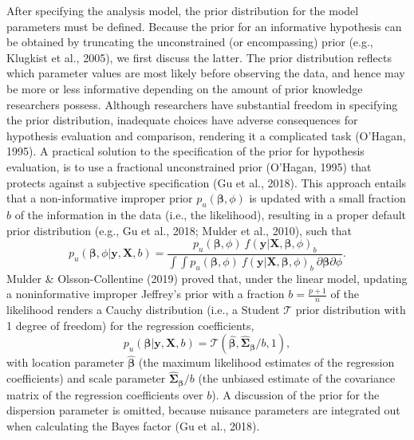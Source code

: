 \documentclass[
]{interact}
\begin{document}
After specifying the analysis model, the prior distribution for the
model parameters must be defined. Because the prior for an informative
hypothesis can be obtained by truncating the unconstrained (or
                                                            encompassing) prior (e.g., Klugkist et al., 2005), we first discuss the
latter. The prior distribution reflects which parameter values are most
likely before observing the data, and hence may be more or less
informative depending on the amount of prior knowledge researchers
possess. Although researchers have substantial freedom in specifying the
prior distribution, inadequate choices have adverse consequences for
hypothesis evaluation and comparison, rendering it a complicated task
(O'Hagan, 1995). A practical solution to the specification of the prior
for hypothesis evaluation, is to use a fractional unconstrained prior
(O'Hagan, 1995) that protects against a subjective specification (Gu et
                                                                  al., 2018). This approach entails that a non-informative improper prior
\(p_u(\boldsymbol{\beta}, \phi)\) is updated with a small fraction \(b\)
of the information in the data (i.e., the likelihood), resulting in a
proper default prior distribution (e.g., Gu et al., 2018; Mulder et al.,
                                   2010), such that \[
                                     p_u(\boldsymbol{\beta}, \phi|\boldsymbol{y}, \boldsymbol{X}, b) = 
                                       \frac{
                                         p_u(\boldsymbol{\beta}, \phi) ~ f(\boldsymbol{y}|\boldsymbol{X}, \boldsymbol{\beta}, \phi)_b
                                       }{
                                         \int \int p_u(\boldsymbol{\beta}, \phi) ~ 
                                           f(\boldsymbol{y}|\boldsymbol{X}, \boldsymbol{\beta}, \phi)_b ~ 
                                           \partial \boldsymbol{\beta} \partial \phi
                                       }.
                                     \] Mulder \& Olsson-Collentine (2019) proved that, under the linear
model, updating a noninformative improper Jeffrey's prior with a
fraction \(b = \frac{p+1}{n}\) of the likelihood renders a Cauchy
distribution (i.e., a Student \(\mathcal{T}\) prior distribution with 1
degree of freedom) for the regression coefficients, \[
p_u(\boldsymbol{\beta} | \boldsymbol{y}, \boldsymbol{X}, b) = 
\mathcal{T}(\boldsymbol{\hat{\beta}}, \boldsymbol{\hat{\Sigma}_\beta} / b, 1),
\] with location parameter \(\boldsymbol{\hat{\beta}}\) (the maximum
likelihood estimates of the regression coefficients) and scale parameter
\(\boldsymbol{\hat{\Sigma}_{\beta}} / b\) (the unbiased estimate of the
covariance matrix of the regression coefficients over \(b\)). A
discussion of the prior for the dispersion parameter is omitted, because
nuisance parameters are integrated out when calculating the Bayes factor
(Gu et al., 2018).
\end{document}

